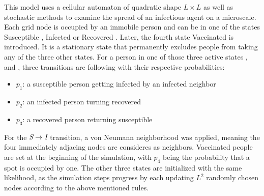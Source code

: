 This model uses a cellular automaton\cite{CellularAutomaton} of quadratic shape $L\times L$ as well as stochastic methods to examine the spread of an infectious agent on a microscale. 
Each grid node is occupied by an immobile person and can be in one of the states Susceptible \susceptible{}, Infected \infected{} or Recovered \recovered{}. Later, the fourth state Vaccinated \vaccinated{} is introduced. 
It is a stationary state that permanently excludes people from taking any of the three other states. 
For a person in one of those three active states \susceptible{}, \infected{} and \recovered{}, three transitions are following with their respective probabilities:
\begin{figure}[H]
    \centering
\end{figure}
\begin{itemize}
    \item $p_1$: a susceptible person getting infected by an infected neighbor
    \item $p_2$: an infected person turning recovered
    \item $p_3$: a recovered person returning susceptible
\end{itemize}
For the $\textit{S}{}\rightarrow\textit{I}{}$ transition, a von Neumann neighborhood was applied, meaning the four immediately adjacing nodes are consideres as neighbors.\cite{CellularAutomaton} 
Vaccinated people \vaccinated{} are set at the beginning of the simulation, with $p_4$ being the probability that a spot is occupied by one. The other three states are initialized with the same likelihood, as the 
simulation steps progress by each updating $L^2$ randomly chosen nodes according to the above mentioned rules.

